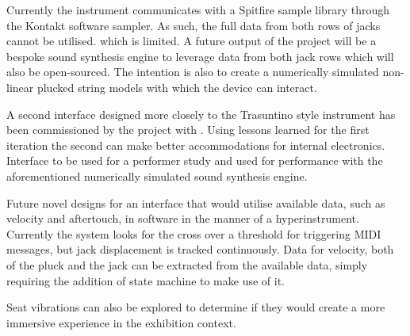 Currently the instrument communicates with a Spitfire sample library through the Kontakt software sampler. As such, the full data from both rows of jacks cannot be utilised. which is limited. A future output of the  project will be a bespoke sound synthesis engine to leverage data from both jack rows
which will also be open-sourced. The intention is also to create a numerically simulated non-linear plucked string models with which the device can interact. 


A second interface designed more closely to the Trasuntino style instrument has been commissioned by the  project with . 
Using lessons learned for the first iteration the second can make better accommodations for internal electronics. Interface to be used for a performer study and used for performance with the aforementioned numerically simulated sound synthesis engine.

Future novel designs for an interface that would utilise available data, such as velocity and aftertouch, in software in the manner of a hyperinstrument.
Currently the system looks for the cross over a threshold for triggering MIDI messages, but jack displacement is tracked continuously. Data for velocity, both of the pluck and the jack can be extracted from the available data, simply requiring the addition of state machine to make use of it.

Seat vibrations \cite{MusicalHaptics2018_07} can also be explored to determine if they would create a more immersive experience in the exhibition context.



